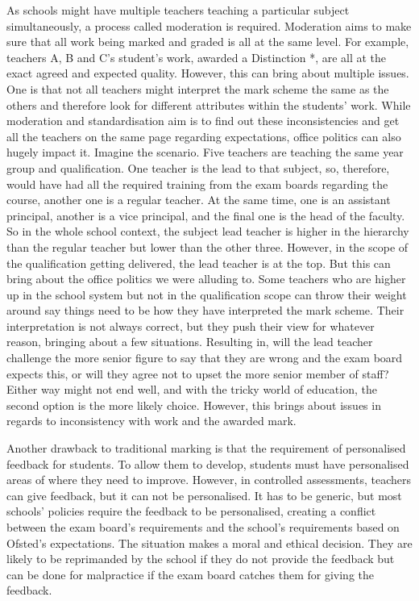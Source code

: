 		As schools might have multiple teachers teaching a particular subject simultaneously, a process called moderation is required. Moderation aims to make sure that all work being marked and graded is all at the same level. For example, teachers A, B and C's student's work, awarded a Distinction *, are all at the exact agreed and expected quality. However, this can bring about multiple issues. One is that not all teachers might interpret the mark scheme the same as the others and therefore look for different attributes within the students' work. While moderation and standardisation aim is to find out these inconsistencies and get all the teachers on the same page regarding expectations, office politics can also hugely impact it. Imagine the scenario. Five teachers are teaching the same year group and qualification. One teacher is the lead to that subject, so, therefore, would have had all the required training from the exam boards regarding the course, another one is a regular teacher. At the same time, one is an assistant principal, another is a vice principal, and the final one is the head of the faculty. So in the whole school context, the subject lead teacher is higher in the hierarchy than the regular teacher but lower than the other three. However, in the scope of the qualification getting delivered, the lead teacher is at the top. But this can bring about the office politics we were alluding to. Some teachers who are higher up in the school system but not in the qualification scope can throw their weight around say things need to be how they have interpreted the mark scheme. Their interpretation is not always correct, but they push their view for whatever reason, bringing about a few situations. Resulting in, will the lead teacher challenge the more senior figure to say that they are wrong and the exam board expects this, or will they agree not to upset the more senior member of staff? Either way might not end well, and with the tricky world of education, the second option is the more likely choice. However, this brings about issues in regards to inconsistency with work and the awarded mark.
		
		Another drawback to traditional marking is that the requirement of personalised feedback for students. To allow them to develop, students must have personalised areas of where they need to improve. However, in controlled assessments, teachers can give feedback, but it can not be personalised. It has to be generic, but most schools' policies require the feedback to be personalised, creating a conflict between the exam board's requirements and the school's requirements based on Ofsted's expectations. The situation makes a moral and ethical decision. They are likely to be reprimanded by the school if they do not provide the feedback but can be done for malpractice if the exam board catches them for giving the feedback.
		
